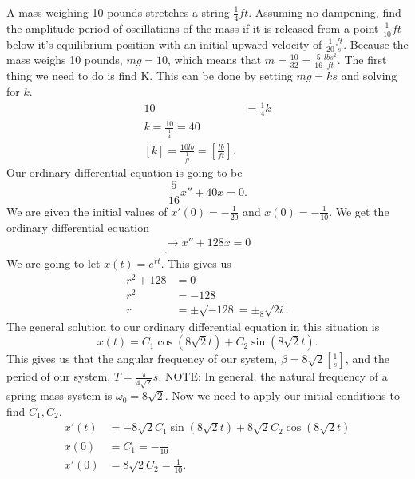   \begin{problem}
    A mass weighing 10 pounds stretches a string $\frac{1}{4}ft$. Assuming no dampening, find the amplitude period of oscillations of the mass if it is released from a point $\frac{1}{10}ft$below it's equilibrium position with an initial upward velocity of $\frac{1}{20}\frac{ft}{s}$.\newline
    Because the mass weighs 10 pounds, $mg=10$, which means that $m=\frac{10}{32}=\frac{5}{16}\frac{lbs^2}{ft}$. The first thing we need to do is find K. This can be done by setting $mg=ks$ and solving for $k$.
    \begin{align*}
      10&=\frac{1}{4}k\\
      k=\frac{10}{\frac{1}{4}}=40\\
      [k]=\frac{10lb}{\frac{1}{ft}}=\left[\frac{lb}{ft}\right]
    .\end{align*}
    Our ordinary differential equation is going to be 
    \[
    \frac{5}{16}x''+40x=0
    .\] 
    We are given the initial values of $x'(0)=-\frac{1}{20}$ and $x(0)=-\frac{1}{10}$. We get the ordinary differential  equation 
    \begin{align*}
      \to x''+128x=0\\
    .\end{align*}
    We are going to let $x(t)=e^{rt}$. This gives us 
    \begin{align*}
      r^2+128&=0\\
      r^2&=-128\\
      r&=\pm\sqrt{-128}=\pm_8\sqrt{2i} 
    .\end{align*}
    The general solution to our ordinary differential equation in this situation is 
    \[
      x(t)=C_1\cos\left( 8\sqrt{2} t \right) +C_2\sin\left( 8\sqrt{2} t \right) 
    .\]
    This gives us that the angular frequency of our system, $\beta=8\sqrt{2} \left[ \frac{1}{s} \right] $, and the period of our system, $T=\frac{\pi}{4\sqrt{2} }s$.\newline
    NOTE: In general, the natural frequency of a spring mass system is $\omega_0=8\sqrt{2} $.\newline
    Now we need to apply our initial conditions to find $C_1,C_2 $.
    \begin{align*}
      x'(t)&=-8\sqrt{2} C_1\sin\left( 8\sqrt{2} t \right) +8\sqrt{2} C_2\cos\left( 8\sqrt{2} t \right) \\
      x(0)&=C_1=-\frac{1}{10}\\
      x'(0)&=8\sqrt{2} C_2=\frac{1}{10}
    .\end{align*}

\end{problem}
